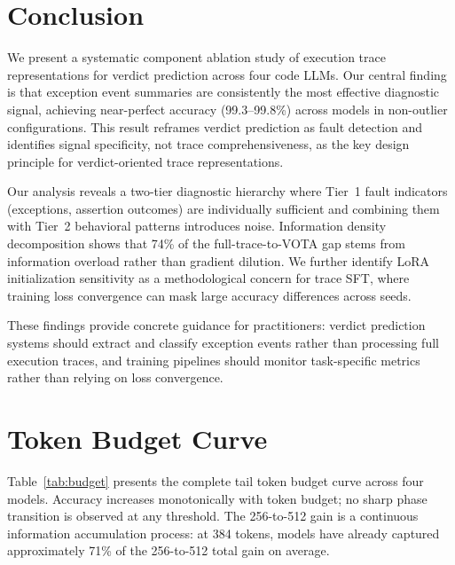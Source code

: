 \documentclass[11pt]{article}
\begin{document}
\section{Conclusion}
\label{sec:conclusion}

We present a systematic component ablation study of execution trace representations for verdict prediction across four code LLMs. Our central finding is that exception event summaries are consistently the most effective diagnostic signal, achieving near-perfect accuracy (99.3--99.8\%) across models in non-outlier configurations. This result reframes verdict prediction as fault detection and identifies signal specificity, not trace comprehensiveness, as the key design principle for verdict-oriented trace representations.

Our analysis reveals a two-tier diagnostic hierarchy where Tier~1 fault indicators (exceptions, assertion outcomes) are individually sufficient and combining them with Tier~2 behavioral patterns introduces noise. Information density decomposition shows that 74\% of the full-trace-to-VOTA gap stems from information overload rather than gradient dilution. We further identify LoRA initialization sensitivity as a methodological concern for trace SFT, where training loss convergence can mask large accuracy differences across seeds.

These findings provide concrete guidance for practitioners: verdict prediction systems should extract and classify exception events rather than processing full execution traces, and training pipelines should monitor task-specific metrics rather than relying on loss convergence.

\appendix
\section{Token Budget Curve}
\label{app:budget}

Table~\ref{tab:budget} presents the complete tail token budget curve across four models. Accuracy increases monotonically with token budget; no sharp phase transition is observed at any threshold. The 256-to-512 gain is a continuous information accumulation process: at 384 tokens, models have already captured approximately 71\% of the 256-to-512 total gain on average.
\end{document}
